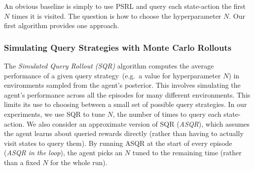 \documentclass{article}
\begin{document}
An obvious baseline is simply to use PSRL and query each state-action the first $N$ times it is visited. The question is how to choose the hyperparameter $N$. Our first algorithm provides one approach. 




\subsubsection{Simulating Query Strategies with Monte Carlo Rollouts}
The \emph{Simulated Query Rollout (SQR)} algorithm computes the average performance of a given query strategy~(e.g.\ a value for hyperparameter $N$) in environments sampled from the agent's posterior. This involves simulating the agent's performance across all the episodes for many different environments. This limits its use to choosing between a small set of possible query strategies. In our experiments, we use SQR to tune $N$, the number of times to query each state-action. We also consider an approximate version of SQR (\emph{ASQR}), which assumes the agent learns about queried rewards directly (rather than having to actually visit states to query them). By running ASQR at the start of every episode (\emph{ASQR in the loop}), the agent picks an $N$ tuned to the remaining time (rather than a fixed $N$ for the whole run). 
\end{document}
